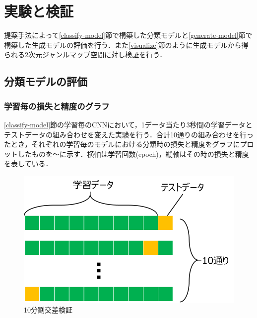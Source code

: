 \chapter{実験と検証}
提案手法によって\ref{classify-model}節で構築した分類モデルと\ref{generate-model}節で構築した生成モデルの評価を行う．また\ref{visualize}節のように生成モデルから得られる2次元ジャンルマップ空間に対し検証を行う．


\section{分類モデルの評価}
\subsection{学習毎の損失と精度のグラフ}
\ref{classify-model}節の学習毎のCNNにおいて，1データ当たり3秒間の学習データとテストデータの組み合わせを変えた実験を行う．合計10通りの組み合わせを行ったとき，それぞれの学習毎のモデルにおける分類時の損失と精度をグラフにプロットしたものを～に示す．横軸は学習回数(epoch)，縦軸はその時の損失と精度を表している．
\begin{figure}[htbp]
	\begin{center}
		\includegraphics[scale=0.7]{./images/dataset/crossval.png}
		\caption{10分割交差検証}
		\label{fig:crossvalidation}
	\end{center}
\end{figure}

